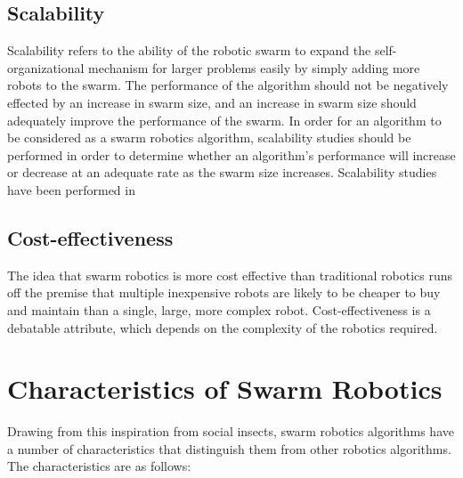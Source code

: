 \subsection{Scalability}
Scalability refers to the ability of the robotic swarm to expand the self-organizational mechanism for larger problems easily by simply adding more robots to the swarm. The performance of the algorithm should not be negatively effected by an increase in swarm size, and an increase in swarm size should adequately improve the performance of the swarm. In order for an algorithm to be considered as a swarm robotics algorithm, scalability studies should be performed in order to determine whether an algorithm's performance will increase or decrease at an adequate rate as the swarm size increases. Scalability studies have been performed in \cite{bahgecci2005evolving,nouyan2008path,zarzhitsky2005distributed}

\subsection{Cost-effectiveness}
The idea that swarm robotics is more cost effective than traditional robotics runs off the premise that multiple inexpensive robots are likely to be cheaper to buy and maintain than a single, large, more complex robot. Cost-effectiveness is a debatable attribute, which depends on the complexity of the robotics required. 


\section{Characteristics of Swarm Robotics}
\label{characteristics}

Drawing from this inspiration from social insects, swarm robotics algorithms have a number of characteristics that distinguish them from other robotics algorithms. The characteristics are as follows:

